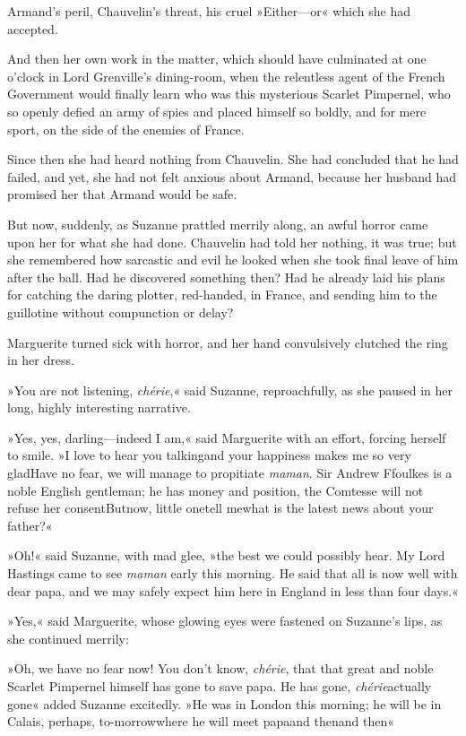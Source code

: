 Armand's peril, Chauvelin's threat, his cruel »Either—or\longdash« which she had accepted.

And then her own work in the matter, which should have culminated at one o'clock in Lord Grenville's dining-room, when the relentless agent of the French Government would finally learn who was this mysterious Scarlet Pimpernel, who so openly defied an army of spies and placed himself so boldly, and for mere sport, on the side of the enemies of France.

Since then she had heard nothing from Chauvelin. She had concluded that he had failed, and yet, she had not felt anxious about Armand, because her husband had promised her that Armand would be safe.

But now, suddenly, as Suzanne prattled merrily along, an awful horror came upon her for what she had done. Chauvelin had told her nothing, it was true; but she remembered how sarcastic and evil he looked when she took final leave of him after the ball. Had he discovered something then? Had he already laid his plans for catching the daring plotter, red-handed, in France, and sending him to the guillotine without compunction or delay?

Marguerite turned sick with horror, and her hand convulsively clutched the ring in her dress.

»You are not listening, \textit{chérie},« said Suzanne, reproachfully, as she paused in her long, highly interesting narrative.

»Yes, yes, darling—indeed I am,« said Marguerite with an effort, forcing herself to smile. »I love to hear you talking\textellipsis \allowbreak  and your happiness makes me so very glad\textellipsis \allowbreak  Have no fear, we will manage to propitiate \textit{maman}. Sir Andrew Ffoulkes is a noble English gentleman; he has money and position, the Comtesse will not refuse her consent\textellipsis \allowbreak  But\textellipsis \allowbreak  now, little one\textellipsis \allowbreak  tell me\textellipsis \allowbreak  what is the latest news about your father?«

»Oh!« said Suzanne, with mad glee, »the best we could possibly hear. My Lord Hastings came to see \textit{maman} early this morning. He said that all is now well with dear papa, and we may safely expect him here in England in less than four days.«

»Yes,« said Marguerite, whose glowing eyes were fastened on Suzanne's lips, as she continued merrily:

»Oh, we have no fear now! You don't know, \textit{chérie}, that that great and noble Scarlet Pimpernel himself has gone to save papa. He has gone, \textit{chérie}\textellipsis \allowbreak  actually gone\textellipsis« added Suzanne excitedly. »He was in London this morning; he will be in Calais, perhaps, to-morrow\textellipsis \allowbreak  where he will meet papa\textellipsis \allowbreak  and then\textellipsis \allowbreak  and then\textellipsis«

